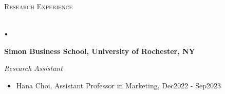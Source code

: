 \documentclass[11pt]{article}
\newcommand{\lineunder}{\vspace*{-8pt} \\ \hspace*{-18pt} \hrulefill \\}
\newcommand{\header}[1]{{\hspace*{-15pt}\vspace*{6pt} \textsc{#1}} \vspace*{-6pt} \lineunder}
\newcommand{\lbt}{\,\begin{picture}(-1,1)(-1,-3)\circle*{3}\end{picture}\ }
\newenvironment{achievements}{
    \begin{list}{$\lbt$}{
        \topsep 0pt
        \itemsep 0pt
        \addtolength{\leftmargin}{-0.1in}
    }
}
{
    \vspace*{4pt}
    \end{list}
}
\begin{document}
\newpage

\header{\Large{Research Experience}}
\vspace{2mm}
\begin{achievements}
\item \textbf{Simon Business School, University of Rochester, NY} \\
\begin{normalsize}
    \textit{Research Assistant}
\end{normalsize}
  \begin{itemize}
      \item[-] Hana Choi, Assistant Professor in Marketing, Dec2022 - Sep2023
      
  \end{itemize}
      
\end{achievements}
\bigskip
\end{document}

